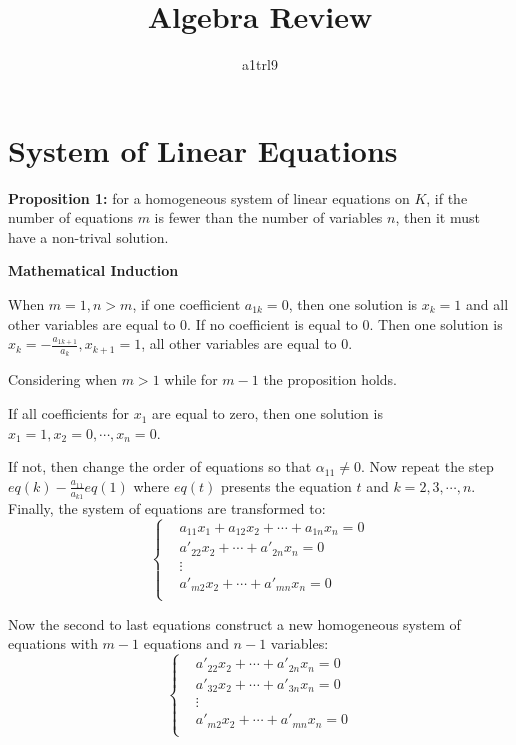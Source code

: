 \documentclass{article}
\author{a1trl9}
\title{Algebra Review}
\date{}
\begin{document}
\maketitle

\section{System of Linear Equations}
\textbf{Proposition 1:} for a homogeneous system of linear equations on
\(K\), if the number of equations \(m\) is fewer than the number of
variables \(n\), then it must have a non-trival solution.

\vspace{2mm}
\textbf{Mathematical Induction}

When \(m=1, n>m\), if one coefficient \(a_{1k}=0\), then one
solution is \(x_k=1\) and
all other variables are equal to \(0\). If no
coefficient is equal to \(0\). Then one solution is
\(x_k = -\frac{a_{1k+1}}{a_{k}},
x_{k+1}=1\), all other variables are equal to \(0\).

\vspace{1mm}
Considering when \(m > 1\) while for \(m-1\) the proposition holds.

If all coefficients for \(x_1\) are equal to zero, then one solution is
\(x_1=1, x_2=0, \cdots, x_n=0\).

If not, then change the order of equations so that \(\alpha_{11} \neq 0\).
Now repeat the step \(eq(k) - \frac{a_{11}}{a_{k1}}eq(1)\) where \(eq(t)\)
presents the equation \(t\) and \(k=2,3,\cdots,n\). Finally, the system
of equations are transformed to:
\begin{equation}
\left\{
\begin{split}
    &a_{11}x_1+a_{12}x_2+\cdots+a_{1n}x_n=0 \\
    &a'_{22}x_2 + \cdots + a'_{2n}x_n=0 \\
    &\vdots\\
    &a'_{m2}x_2 + \cdots + a'_{mn}x_n=0 \\
\end{split}
\right.
\end{equation}

Now the second to last equations construct a new homogeneous system
of equations with \(m-1\) equations and \(n-1\) variables:
\begin{equation}
\left\{
\begin{split}
    &a'_{22}x_2 + \cdots + a'_{2n}x_n=0 \\
    &a'_{32}x_2 + \cdots + a'_{3n}x_n=0 \\
    &\vdots\\
    &a'_{m2}x_2 + \cdots + a'_{mn}x_n=0 \\
\end{split}
\right.
\end{equation}
\end{document}
